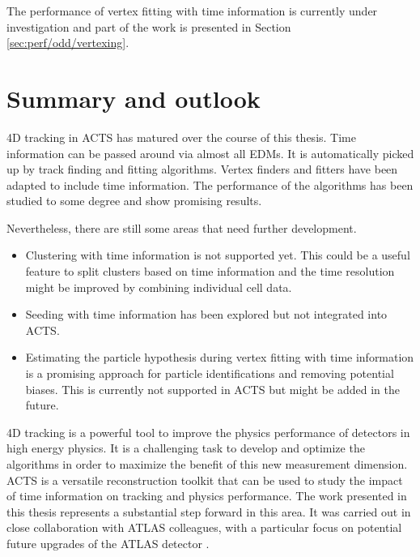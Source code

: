 The performance of vertex fitting with time information is currently under investigation and part of the work is presented in Section \ref{sec:perf/odd/vertexing}.

\section{Summary and outlook}

4D tracking in ACTS has matured over the course of this thesis. Time information can be passed around via almost all EDMs. It is automatically picked up by track finding and fitting algorithms. Vertex finders and fitters have been adapted to include time information. The performance of the algorithms has been studied to some degree and show promising results.

Nevertheless, there are still some areas that need further development.
\begin{itemize}
    \item Clustering with time information is not supported yet. This could be a useful feature to split clusters based on time information and the time resolution might be improved by combining individual cell data.
    \item Seeding with time information has been explored but not integrated into ACTS.
    \item Estimating the particle hypothesis during vertex fitting with time information is a promising approach for particle identifications and removing potential biases. This is currently not supported in ACTS but might be added in the future.
\end{itemize}

4D tracking is a powerful tool to improve the physics performance of detectors in high energy physics. It is a challenging task to develop and optimize the algorithms in order to maximize the benefit of this new measurement dimension. ACTS is a versatile reconstruction toolkit that can be used to study the impact of time information on tracking and physics performance. The work presented in this thesis represents a substantial step forward in this area. It was carried out in close collaboration with ATLAS colleagues, with a particular focus on potential future upgrades of the ATLAS detector \cite{pub-2023-023}.
